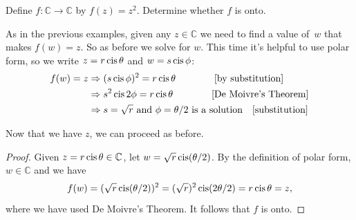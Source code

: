 \begin{example}{}
Define $f \colon \mathbb{C} \to \mathbb{C}$ by $f(z) = z^2$. Determine whether $f$ is onto.

\begin{scratchwork}
As in the previous examples, given any $z \in \mathbb{C}$  we need to find a value of~$w$ that makes $f(w) = z$. So as before we solve for $w$. This time it's helpful to use polar form, so we write $z = r \operatorname{cis} \theta$
and $w = s \operatorname{cis} \phi$:
\begin{align*}
f(w) = z  &\Rightarrow (s \operatorname{cis} \phi)^2 = r \operatorname{cis} \theta \qquad \qquad \text{[by substitution]}\\
 & \Rightarrow s^2 \operatorname{cis} 2\phi = r \operatorname{cis} \theta\qquad \qquad \text{[De Moivre's Theorem]}\\
& \Rightarrow s = \sqrt{r} \text{ and } \phi = \theta/2 \text{ is a solution} \quad \text{[substitution]}
\end{align*}
\end{scratchwork}

\noindent
Now that we have $z$, we can proceed as before.

\begin{proof} 
Given $z= r \operatorname{cis} \theta  \in \mathbb{C}$, let $w = \sqrt{r} \operatorname{cis} (\theta/2)$. By the definition of polar form, $w \in  \mathbb{C}$ and we have
\[ f(w) =  (\sqrt{r} \operatorname{cis} (\theta/2) )^2  = (\sqrt{r})^2 \operatorname{cis} (2\theta/2) = r \operatorname{cis} \theta = z, \]
where we have used De Moivre's Theorem. It follows that $f$ is onto.
\end{proof}
\end{example}


% 

